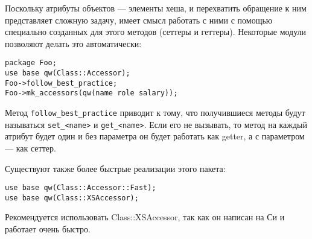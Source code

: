 Поскольку атрибуты объектов --- элементы хеша, и перехватить обращение к ним представляет сложную задачу, имеет смысл работать с ними с помощью специально созданных для этого методов (сеттеры и геттеры). Некоторые модули позволяют делать это автоматически:
\begin{verbatim}
package Foo;
use base qw(Class::Accessor);
Foo->follow_best_practice;
Foo->mk_accessors(qw(name role salary));
\end{verbatim}
Метод \verb|follow_best_practice| приводит к тому, что получившиеся методы будут называться \verb|set_<name>| и \verb|get_<name>|. Если его не вызывать, то метод на каждый атрибут будет один и без параметра он будет работать как getter, а с параметром --- как сеттер.

Существуют также более быстрые реализации этого пакета:
\begin{verbatim}
use base qw(Class::Accessor::Fast);
use base qw(Class::XSAccessor);
\end{verbatim}
Рекомендуется использовать Class::XSAccessor, так как он написан на Си и работает очень быстро.

